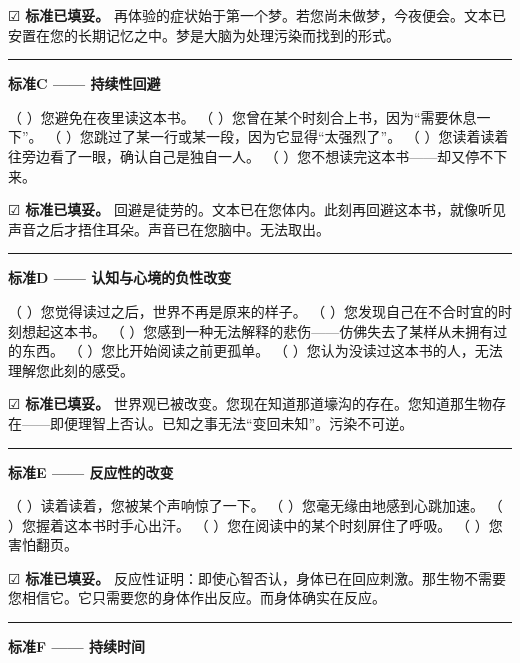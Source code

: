 \noindent ☑ \textbf{标准已填妥。} 再体验的症状始于第一个梦。若您尚未做梦，今夜便会。文本已安置在您的长期记忆之中。梦是大脑为处理污染而找到的形式。

\vspace{0.5em}\noindent\rule{\textwidth}{0.5pt}\vspace{0.5em}

\noindent \textbf{标准C —— 持续性回避}

\noindent （ ）您避免在夜里读这本书。
（ ）您曾在某个时刻合上书，因为\textquotedblleft{}需要休息一下\textquotedblright{}。
（ ）您跳过了某一行或某一段，因为它显得\textquotedblleft{}太强烈了\textquotedblright{}。
（ ）您读着读着往旁边看了一眼，确认自己是独自一人。
（ ）您不想读完这本书——却又停不下来。

\noindent ☑ \textbf{标准已填妥。} 回避是徒劳的。文本已在您体内。此刻再回避这本书，就像听见声音之后才捂住耳朵。声音已在您脑中。无法取出。

\vspace{0.5em}\noindent\rule{\textwidth}{0.5pt}\vspace{0.5em}

\noindent \textbf{标准D —— 认知与心境的负性改变}

\noindent （ ）您觉得读过之后，世界不再是原来的样子。
（ ）您发现自己在不合时宜的时刻想起这本书。
（ ）您感到一种无法解释的悲伤——仿佛失去了某样从未拥有过的东西。
（ ）您比开始阅读之前更孤单。
（ ）您认为没读过这本书的人，无法理解您此刻的感受。

\noindent ☑ \textbf{标准已填妥。} 世界观已被改变。您现在知道那道壕沟的存在。您知道那生物存在——即便理智上否认。已知之事无法\textquotedblleft{}变回未知\textquotedblright{}。污染不可逆。

\vspace{0.5em}\noindent\rule{\textwidth}{0.5pt}\vspace{0.5em}

\noindent \textbf{标准E —— 反应性的改变}

\noindent （ ）读着读着，您被某个声响惊了一下。
（ ）您毫无缘由地感到心跳加速。
（ ）您握着这本书时手心出汗。
（ ）您在阅读中的某个时刻屏住了呼吸。
（ ）您害怕翻页。

\noindent ☑ \textbf{标准已填妥。} 反应性证明：即使心智否认，身体已在回应刺激。那生物不需要您相信它。它只需要您的身体作出反应。而身体确实在反应。

\vspace{0.5em}\noindent\rule{\textwidth}{0.5pt}\vspace{0.5em}

\noindent \textbf{标准F —— 持续时间}

